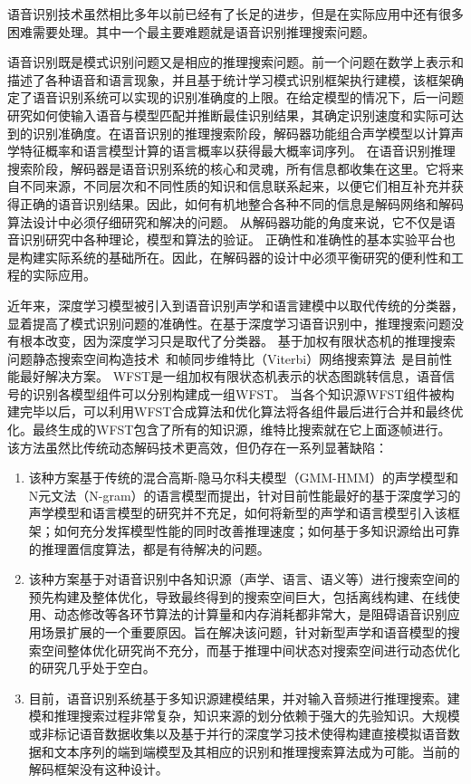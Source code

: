 语音识别技术虽然相比多年以前已经有了长足的进步，但是在实际应用中还有很多困难需要处理。其中一个最主要难题就是语音识别推理搜索问题。

语音识别既是模式识别问题又是相应的推理搜索问题。前一个问题在数学上表示和描述了各种语音和语言现象，并且基于统计学习模式识别框架执行建模，该框架确定了语音识别系统可以实现的识别准确度的上限。在给定模型的情况下，后一问题研究如何使输入语音与模型匹配并推断最佳识别结果，其确定识别速度和实际可达到的识别准确度。在语音识别的推理搜索阶段，解码器功能组合声学模型以计算声学特征概率和语言模型计算的语言概率以获得最大概率词序列。
在语音识别推理搜索阶段，解码器是语音识别系统的核心和灵魂，所有信息都收集在这里。它将来自不同来源，不同层次和不同性质的知识和信息联系起来，以便它们相互补充并获得正确的语音识别结果。因此，如何有机地整合各种不同的信息是解码网络和解码算法设计中必须仔细研究和解决的问题。
从解码器功能的角度来说，它不仅是语音识别研究中各种理论，模型和算法的验证。
正确性和准确性的基本实验平台也是构建实际系统的基础所在。因此，在解码器的设计中必须平衡研究的便利性和工程的实际应用。


近年来，深度学习模型被引入到语音识别声学和语言建模中以取代传统的分类器，显着提高了模式识别问题的准确性。在基于深度学习语音识别中，推理搜索问题没有根本改变，因为深度学习只是取代了分类器。
基于加权有限状态机的推理搜索问题静态搜索空间构造技术~\cite{mohri2002weighted}和帧同步维特比（Viterbi）网络搜索算法~\cite{forney1973viterbi}是目前性能最好解决方案。
WFST是一组加权有限状态机表示的状态图跳转信息，语音信号的识别各模型组件可以分别构建成一组WFST。
当各个知识源WFST组件被构建完毕以后，可以利用WFST合成算法和优化算法将各组件最后进行合并和最终优化。最终生成的WFST包含了所有的知识源，维特比搜索就在它上面逐帧进行。
该方法虽然比传统动态解码技术更高效，但仍存在一系列显著缺陷：
\begin{enumerate}
\item 
该种方案基于传统的混合高斯-隐马尔科夫模型（GMM-HMM）的声学模型和N元文法（N-gram）的语言模型而提出，针对目前性能最好的基于深度学习的声学模型和语言模型的研究并不充足，如何将新型的声学和语言模型引入该框架；如何充分发挥模型性能的同时改善推理速度；如何基于多知识源给出可靠的推理置信度算法，都是有待解决的问题。
\item 
该种方案基于对语音识别中各知识源（声学、语言、语义等）进行搜索空间的预先构建及整体优化，导致最终得到的搜索空间巨大，包括离线构建、在线使用、动态修改等各环节算法的计算量和内存消耗都非常大，是阻碍语音识别应用场景扩展的一个重要原因。旨在解决该问题，针对新型声学和语音模型的搜索空间整体优化研究尚不充分，而基于推理中间状态对搜索空间进行动态优化的研究几乎处于空白。
\item 目前，语音识别系统基于多知识源建模结果，并对输入音频进行推理搜索。建模和推理搜索过程非常复杂，知识来源的划分依赖于强大的先验知识。大规模或非标记语音数据收集以及基于并行的深度学习技术使得构建直接模拟语音数据和文本序列的端到端模型及其相应的识别和推理搜索算法成为可能。当前的解码框架没有这种设计。
\end{enumerate}

